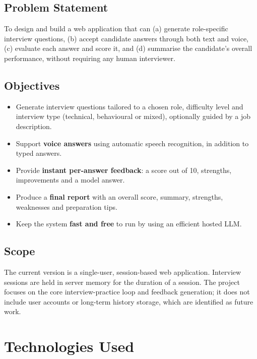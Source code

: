 \documentclass[11pt,a4paper]{article}
\begin{document}
\subsection{Problem Statement}
To design and build a web application that can (a) generate role-specific interview
questions, (b) accept candidate answers through both text and voice, (c) evaluate each
answer and score it, and (d) summarise the candidate's overall performance, without
requiring any human interviewer.

\subsection{Objectives}
\begin{itemize}[leftmargin=1.4em]
  \item Generate interview questions tailored to a chosen role, difficulty level and
        interview type (technical, behavioural or mixed), optionally guided by a job
        description.
  \item Support \textbf{voice answers} using automatic speech recognition, in addition
        to typed answers.
  \item Provide \textbf{instant per-answer feedback}: a score out of 10, strengths,
        improvements and a model answer.
  \item Produce a \textbf{final report} with an overall score, summary, strengths,
        weaknesses and preparation tips.
  \item Keep the system \textbf{fast and free} to run by using an efficient hosted LLM.
\end{itemize}

\subsection{Scope}
The current version is a single-user, session-based web application. Interview
sessions are held in server memory for the duration of a session. The project focuses
on the core interview-practice loop and feedback generation; it does not include user
accounts or long-term history storage, which are identified as future work.

\section{Technologies Used}
\end{document}
